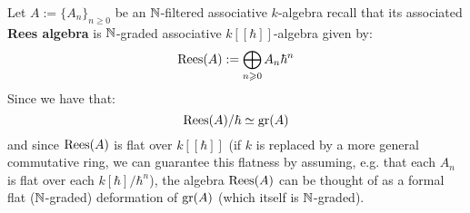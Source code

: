            \begin{example} \label{example: rees_algebras_as_formal_flat_deformations}
                Let $A := \{A_n\}_{n \geq 0}$ be an $\mathbb{N}$-filtered associative $k$-algebra recall that its associated \textbf{Rees algebra} is $\mathbb{N}$-graded associative $k[\![\hbar]\!]$-algebra given by:
                    $$\operatorname{Rees}(A) := \bigoplus_{n \geqslant 0} A_n \hbar^n$$
                Since we have that:
                    $$\operatorname{Rees}(A)/\hbar \simeq \operatorname{gr}(A)$$
                and since $\operatorname{Rees}(A)$ is flat over $k[\![\hbar]\!]$ (if $k$ is replaced by a more general commutative ring, we can guarantee this flatness by assuming, e.g. that each $A_n$ is flat over each $k[\hbar]/\hbar^n$), the algebra $\operatorname{Rees}(A)$ can be thought of as a formal flat ($\mathbb{N}$-graded) deformation of $\operatorname{gr}(A)$ (which itself is $\mathbb{N}$-graded). 
            \end{example}
    
